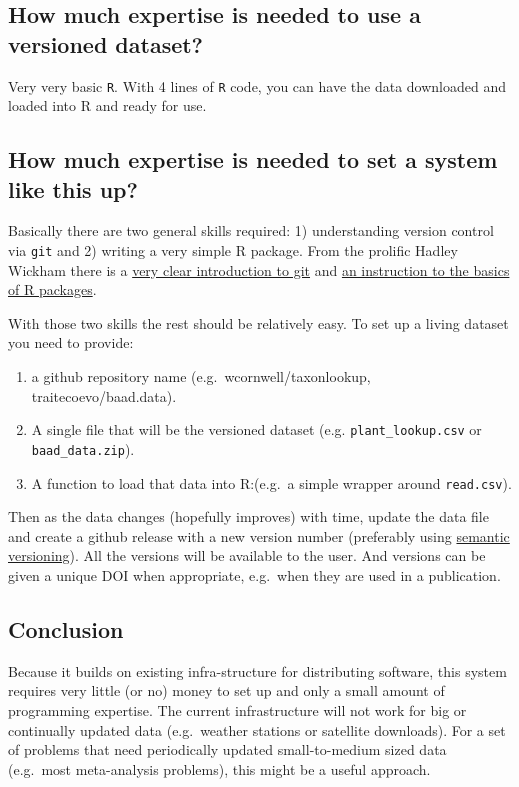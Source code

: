 \documentclass[a4paper,11pt]{article}
\begin{document}
\subsection{How much expertise is needed to use a versioned
dataset?}

Very very basic \texttt{R}. With 4 lines of \texttt{R} code, you can
have the data downloaded and loaded into R and ready for use.

\subsection{How much expertise is needed to set a system like this
up?}

Basically there are two general skills required: 1) understanding
version control via \texttt{git} and 2) writing a very simple R package.
From the prolific Hadley Wickham there is a
\href{http://r-pkgs.had.co.nz/git.html}{very clear introduction to git}
and \href{http://r-pkgs.had.co.nz/intro.html}{an instruction to the
basics of R packages}.

With those two skills the rest should be relatively easy. To set up a
living dataset you need to provide:
\begin{enumerate}
  \item a github repository name (e.g.~wcornwell/taxonlookup, traitecoevo/baad.data).
  \item A single file that will be the versioned dataset (e.g. \texttt{plant\_lookup.csv} or \texttt{baad\_data.zip}).
  \item A function to load that data into R:(e.g.~a simple wrapper around \texttt{read.csv}).
\end{enumerate}

Then as the data changes (hopefully improves) with time, update the data
file and create a github release with a new version number (preferably
using \href{http://semver.org/}{semantic versioning}). All the versions
will be available to the user. And versions can be given a unique DOI
when appropriate, e.g.~when they are used in a publication.

\subsection{Conclusion}

Because it builds on existing infra-structure for distributing software,
this system requires very little (or no) money to set up and only a
small amount of programming expertise. The current infrastructure will
not work for big or continually updated data (e.g.~weather stations or
satellite downloads). For a set of problems that need periodically
updated small-to-medium sized data (e.g.~most meta-analysis problems),
this might be a useful approach.
\end{document}
